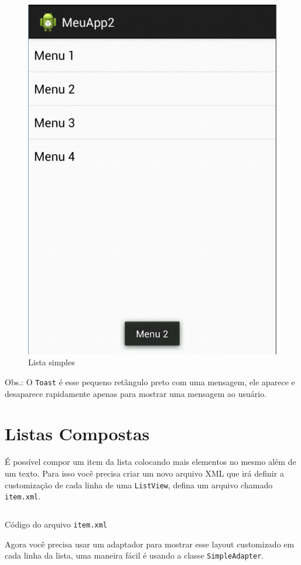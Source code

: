 \documentclass[a4paper,12pt,brazil,doubleside]{book}
\begin{document}
\begin{singlespace}
\begin{figure}[H]
  \centering
  \includegraphics[width=.7\textwidth]{figuras/design/lista.png}
  \caption{Lista simples}
  \label{fig:e}
\end{figure}

Obs.: O \texttt{Toast} é esse pequeno retângulo preto com uma mensagem, ele aparece e desaparece rapidamente apenas para mostrar uma mensagem ao usuário.

\section{Listas Compostas}
É possível compor um item da lista colocando mais elementos no mesmo além de um texto. Para isso você precisa criar um novo arquivo XML que irá definir a customização de cada linha de uma \texttt{ListView}, defina um arquivo chamado \texttt{\textcolor{mygreen}{item.xml}}.

\newpage

\begin{listing}[H]
\inputminted[linenos=true,fontsize=\small,frame=lines, framesep=2mm, tabsize=2,numbersep=5pt]{xml}{src/design/item.xml}
\caption{Código do arquivo \texttt{\textcolor{mygreen}{item.xml}}}
\end{listing}	

Agora você precisa usar um adaptador para mostrar esse layout customizado em cada linha da lista, uma maneira fácil é usando a classe \texttt{SimpleAdapter}.


\end{singlespace}
\end{document}
